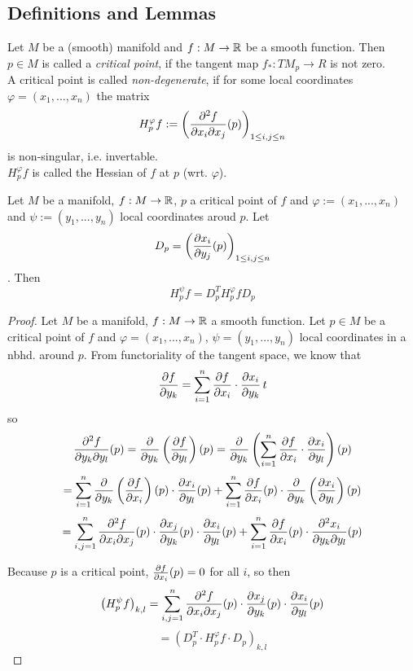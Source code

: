 \subsection{Definitions and Lemmas}

\begin{definition}
   \label{def:critical point}

   Let $M$ be a (smooth) manifold and $f: M \rightarrow \R$ be a smooth 
   function. Then $p \in M$ is called a \textit{critical point}, if the 
   tangent map $f_*: TM_p \rightarrow R$ is not zero. \\
   A critical point is called \textit{non-degenerate}, if for some local 
   coordinates $\varphi = (x_1, ..., x_n)$
   the matrix 
   \[ H_p^{\varphi}f := 
   \left(\frac{\del^2 f}{\del x_i \del x_j}(p)\right)_{1 \leq i,j \leq n} \]
   is non-singular, i.e. invertable. \\
   $H_p^{\varphi}f$ is called the Hessian of $f$ at $p$ (wrt. $\varphi$).

\end{definition}

\begin{lemma}
   \label{lemma:congruency}   

   Let $M$ be a manifold, $f: M \rightarrow \R$, $p$ a critical point of $f$
   and $\varphi := (x_1, ..., x_n)$ and $\psi := (y_1, ..., y_n)$ local 
   coordinates aroud $p$. Let 
   \[ D_p = \left( \frac{\del x_i}{\del y_j}(p) \right)_{1 \leq i, j \leq n}\].
   Then 
   \[ H_p^{\psi}f = D_p^T H_p^{\varphi}f D_p \]

\end{lemma}

\begin{proof}

   Let $M$ be a manifold, $f: M \rightarrow \R$ a smooth function.
   Let $p \in M$ be a critical point of $f$ and $\varphi = (x_1, ..., x_n)$, 
   $\psi = (y_1, ..., y_n)$ local coordinates in a nbhd. around $p$.
   From functoriality of the tangent space, we know that 
   \[ \frac{\del f}{\del y_k} = 
   \sum_{i=1}^n \frac{\del f}{\del x_i} \cdot \frac{\del x_i}{\del y_k} \,t \]
   so 
   \[ \pdderive[f]{y_k}{y_l} (p) 
   = \pderive{y_k} \left( \pderive[f]{y_l} \right) (p) 
   = \pderive{y_k} \left( \sum_{i=1}^n \pderive[f]{x_i} \cdot \pderive[x_i]{y_l} \right) (p) \]
   \[ = \sum_{i=1}^n \pderive{y_k} \left( \pderive[f]{x_i} \right) (p) \cdot \pderive[x_i]{y_l} (p) 
   + \sum_{i=1}^n \pderive[f]{x_i} (p) \cdot \pderive{y_k} \left( \pderive[x_i]{y_l} \right) (p) \]
   \[ = \sum_{i,j = 1}^n \pdderive[f]{x_i}{x_j} (p) \cdot \pderive[x_j]{y_k} (p) \cdot \pderive[x_i]{y_l}(p)
   + \sum_{i=1}^n \pderive[f]{x_i} (p) \cdot \pdderive[x_i]{y_k}{y_l}(p)\]
   
   Because $p$ is a critical point, $\pderive[f]{x_i} (p) = 0$ for all $i$, so then
   \[ \left( H_p^{\psi}f \right)_{k,l} 
   = \sum_{i,j = 1}^n \pdderive[f]{x_i}{x_j} (p) \cdot \pderive[x_j]{y_k}(p) \cdot \pderive[x_i]{y_l} (p) \]
   \[ = \left( D_p^T \cdot H_p^{\varphi}f \cdot D_p \right)_{k,l} \]

\end{proof}

